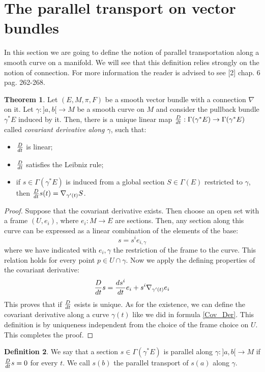 \documentclass[12pt,a4paper]{report}
\theoremstyle{definition}
\newtheorem{Def}{Definition}[chapter]
\theoremstyle{Theorem}
\newtheorem{Theo}[Def]{Theorem}
\theoremstyle{definition}
\theoremstyle{definition}
\begin{document}
	\section{The parallel transport on vector bundles}
	In this section we are going to define the notion of parallel transportation along a smooth curve on a manifold. We will see that this definition relies strongly on the notion of connection. For more information the reader is advised to see [2] chap. 6 pag. 262-268.
	\begin{Theo}
		Let $(E,M,\pi,F)$ be a smooth vector bundle with a connection $\nabla$ on it. Let $\gamma:]a,b[\rightarrow M$ be a smooth curve on $M$ and consider the pullback bundle $\gamma^*E$ induced by it. Then, there is a unique linear map ${D\over dt}:\Gamma(\gamma^*E)\rightarrow \Gamma(\gamma^*E)$ called \textit{covariant derivative along $\gamma$}, such that:
		\begin{itemize}
			\item ${D\over dt}$ is linear;
			\item ${D\over dt}$ satisfies the Leibniz rule;
			\item if $s\in \Gamma(\gamma^*E)$ is induced from a global section $S\in\Gamma(E)$ restricted to $\gamma$, then ${D\over dt}s(t)=\nabla_{\gamma'(t)}S$.
		\end{itemize}
	\end{Theo}
	\begin{proof}
		Suppose that the covariant derivative exists. Then choose an open set with a frame $(U,{e_i})$, where $e_i:M\rightarrow
		E$ are sections. Then, any section along this curve can be expressed as a linear combination of the elements of the base:
		$$s=s^ie_{i,\gamma}$$
		where we have indicated with $e_i,{\gamma}$ the restriction of the frame to the curve. This relation holds for every point $p\in U\cap\gamma$. Now we apply the defining properties of the covariant derivative:
		\begin{equation}\label{Cov_Der}
		{D\over dt}s={ds^i\over dt}e_i+s^i\nabla_{\gamma'(t)}e_i	
		\end{equation}
		This proves that if $D\over dt$ esists is unique. As for the existence, we can define the covariant derivative along a curve $\gamma(t)$ like we did in formula \ref{Cov_Der}. This definition is by uniqueness independent from the choice of the frame choice on $U$. This completes the proof.
	\end{proof}
	\begin{Def}
		We say that a section $s\in\Gamma(\gamma^*E)$ is parallel along $\gamma:]a,b[\rightarrow M$ if ${D\over dt}s=0$ for every $t$. We call $s(b)$ the parallel transport of $s(a)$ along $\gamma$.
	\end{Def}
\end{document}
